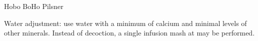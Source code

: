 \stylesection{\styleczechpremiumpalelager}

\begin{recipe}{Hobo BoHo Pilsner} %

\begin{aboutblock}
\end{aboutblock}


\begin{methodandtiming}
 
\begin{mashsteps}
\mashdecoctboil{}
\mashdecoctboil{}
\end{mashsteps}

\begin{fermentationsteps}
\end{fermentationsteps}

\begin{directions}
Water adjustment: use water with a minimum of  calcium and
minimal levels of other minerals. Instead of decoction, a single infusion
mash at  may be performed.
\end{directions}

\end{methodandtiming}

\recipebreak

\begin{ingredientsblock}

\begin{malts}
\end{malts}

\begin{hops}
\end{hops}


\end{ingredientsblock}

\end{recipe}


